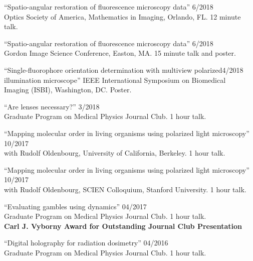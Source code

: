 \documentclass[12pt,letterpaper]{article}
\begin{document}
\begin{etaremune}[labelsep=0.035\textwidth]
\item {``Spatio-angular restoration of fluorescence microscopy data'' \hfill 6/2018\\
      Optics Society of America, Mathematics in Imaging, Orlando, FL. 12 minute talk.}
  
\item {``Spatio-angular restoration of fluorescence microscopy data'' \hfill 6/2018\\
      Gordon Image Science Conference, Easton, MA. 15 minute talk and poster.}

  \item {``Single-fluorophore orientation determination with multiview polarized\hfill 4/2018\\
      illumination microscope'' IEEE International Symposium on Biomedical\\ Imaging (ISBI), Washington, DC. Poster.}
  
\item {``Are lenses necessary?'' \hfill 3/2018\\
    Graduate Program on Medical Physics Journal Club. 1 hour talk.}
  
\item {``Mapping molecular order in living organisms using polarized light microscopy'' \hfill 10/2017\\
    with Rudolf Oldenbourg, University of California, Berkeley. 1 hour talk.}
  
\item {``Mapping molecular order in living organisms using polarized light microscopy'' \hfill 10/2017\\
    with Rudolf Oldenbourg, SCIEN Colloquium, Stanford University. 1 hour talk.}
  
\item {``Evaluating gambles using dynamics'' \hfill 04/2017\\
    Graduate Program on Medical Physics Journal Club. 1 hour talk.\\
    \textbf{Carl J. Vyborny Award for Outstanding Journal Club Presentation}}

\item {``Digital holography for radiation dosimetry'' \hfill 04/2016\\
    Graduate Program on Medical Physics Journal Club. 1 hour talk.}
\end{etaremune}
\end{document}
